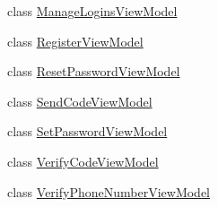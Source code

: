 \begin{DoxyCompactItemize}
class \hyperlink{class_cloud_bread_admin_web_1_1_models_1_1_manage_logins_view_model}{Manage\+Logins\+View\+Model}
\item 
class \hyperlink{class_cloud_bread_admin_web_1_1_models_1_1_register_view_model}{Register\+View\+Model}
\item 
class \hyperlink{class_cloud_bread_admin_web_1_1_models_1_1_reset_password_view_model}{Reset\+Password\+View\+Model}
\item 
class \hyperlink{class_cloud_bread_admin_web_1_1_models_1_1_send_code_view_model}{Send\+Code\+View\+Model}
\item 
class \hyperlink{class_cloud_bread_admin_web_1_1_models_1_1_set_password_view_model}{Set\+Password\+View\+Model}
\item 
class \hyperlink{class_cloud_bread_admin_web_1_1_models_1_1_verify_code_view_model}{Verify\+Code\+View\+Model}
\item 
class \hyperlink{class_cloud_bread_admin_web_1_1_models_1_1_verify_phone_number_view_model}{Verify\+Phone\+Number\+View\+Model}
\end{DoxyCompactItemize}
